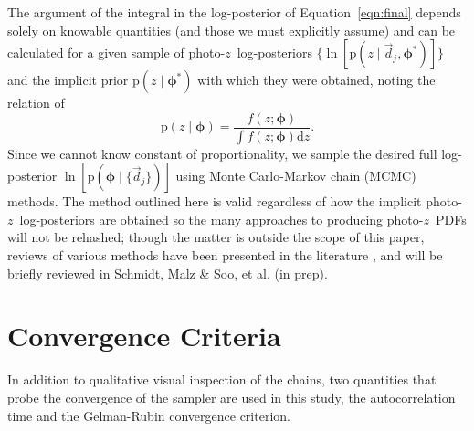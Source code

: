 \documentclass[iop]{emulateapj}
\newcommand{\Eq}[1]{Equation~\ref{#1}}
\newcommand{\Fig}[1]{Figure~\ref{#1}}
\newcommand{\data}{\ensuremath{\vec{d}}}%
\newcommand{\pr}[1]{\ensuremath{\mathrm{p}(#1)}}%
\newcommand{\gvn}{\mid}%
\newcommand{\integral}[2]{\ensuremath{\int #1 \mathrm{d} #2}}
\newcommand{\pz}{photo-$z$}
\newcommand{\pzpdf}{\pz\ PDF}%
\newcommand{\bvec}[1]{\ensuremath{\boldsymbol{#1}}}%
\newcommand{\ndphi}{\bvec{\phi}}
\begin{document}
The argument of the integral in the log-posterior of \Eq{eqn:final} depends solely on knowable quantities (and those we must explicitly assume) and can be calculated for a given sample of \pz\ log-posteriors $\{\ln[\pr{z \gvn \data_{j}, \ndphi^{*}}]\}$ and the implicit prior $\pr{z \gvn \ndphi^{*}}$ with which they were obtained, noting the relation of 
\begin{equation}
\label{eqn:params}
\pr{z \gvn \ndphi} = \frac{f(z; \ndphi)}{\integral{f(z; \ndphi)}{z}}.
\end{equation}
Since we cannot know constant of proportionality, we sample the desired full log-posterior $\ln[\pr{\ndphi \gvn \{\data_{j}\}}]$ using Monte Carlo-Markov chain (MCMC) methods.  
The method outlined here is valid regardless of how the implicit \pz\ log-posteriors are obtained so the many approaches to producing \pzpdf s will not be rehashed; though the matter is outside the scope of this paper, reviews of various methods have been presented in the literature \citep{sheldon_photometric_2012, ball_robust_2008, carrasco_kind_tpz:_2013, carrasco_kind_exhausting_2014}, and will be briefly reviewed in Schmidt, Malz \& Soo, et al. (in prep).
%

\section{Convergence Criteria}
\label{app:acorr}

In addition to qualitative visual inspection of the chains, two quantities that probe the convergence of the sampler are used in this study, the autocorrelation time and the Gelman-Rubin convergence criterion.  

\end{document}
